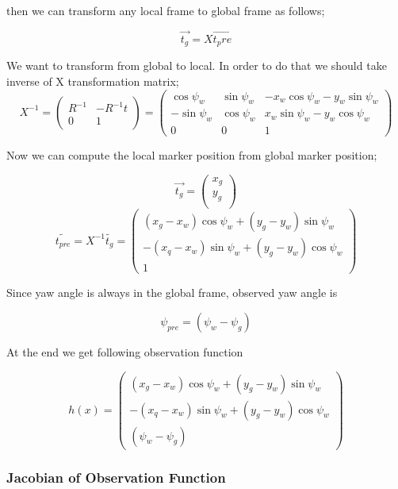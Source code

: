 \documentclass[14pt,a4paper]{article}
\begin{document}
		then we can transform any local frame to global frame as follows;
		
				\[\vec{t_g}= X \vec{t_pre} \]
				
		We want to transform from global to local. In order to do that we should take inverse of X transformation matrix;
		$$	X^{-1} =	\begin{pmatrix} 
		
					R^{-1} & -R^{-1}t \\
					0 & 1 
				\end{pmatrix}
			=	\begin{pmatrix}
					\cos\psi_{w}	 &	\sin\psi_{w} & -x_{w}\cos\psi_{w}-y_{w}\sin\psi_{w}\\	
					-\sin\psi_{w} &	\cos\psi_{w}	 &  x_{w}\sin\psi_{w}-y_{w}\cos\psi_{w}\\
					0		 &		0	&	1
				\end{pmatrix}
		$$
		
		
		Now we can compute the local marker position from global marker position;
		
		\[\vec{t_{g}}= \left( \begin{array}{c}
						x_{g} \\ y_{g}\\ 
				\end{array} \right)\] 	
		$$
			\tilde{t_{pre}}  = X^{-1} \tilde{t_{g}}
			= \begin{pmatrix}
					(x_{g} - x_{w})\cos\psi_{w}	 +	(y_{g}-y_{w})\sin\psi_{w}\\ 	
					-(x_{q} - x_{w})\sin\psi_{w} +	(y_{g}-y_{w})\cos\psi_{w}\\
												1
				\end{pmatrix}
		$$
		
		Since yaw angle is always in the global frame, observed yaw angle is
		
		\[ \psi_{pre}=(\psi_{w} - \psi_{g})\]
		
		At the end we get following observation function
		
		$$
		h(x)	= \begin{pmatrix}
					(x_{g} - x_{w})\cos\psi_{w}	 +	(y_{g}-y_{w})\sin\psi_{w}\\ 	
					-(x_{q} - x_{w})\sin\psi_{w} +	(y_{g}-y_{w})\cos\psi_{w}\\
											(\psi_{w} - \psi_{g})
			\end{pmatrix}
		$$
		
		\subsubsection{Jacobian of Observation Function}
		
\end{document}
